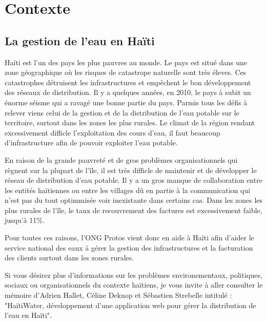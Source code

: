 \documentclass{EPL-master-thesis-covers-FR}
\begin{document}

	\chapter{Contexte}


		\section{La gestion de l'eau en Haïti}
			\label{sec:situation}
			
				Haïti est l'un des pays les plus pauvres au monde. Le pays est situé dans une zone géographique où les risques de catastrope naturelle sont très éleves. Ces catastrophes détruisent les infrastructures et empêchent le bon développement des réseaux de distribution. Il y a quelques années, en 2010, le pays à subit un énorme séisme qui a ravagé une bonne partie du pays. Parmis tous les défis à relever viens celui de la gestion et de la distribution de l'eau potable sur le territoire, surtout dans les zones les plus rurales. Le climat de la région rendant excessivement difficle l'exploitation des cours d'eau, il faut beaucoup d'infrastructure afin de pouvoir exploiter l'eau potable.
				
				En raison de la grande pauvreté et de gros problèmes organisationnels qui règnent sur la plupart de l'île, il est très difficle de maintenir et de développer le réseau de distribution d'eau potable. Il y a un gros manque de collaboration entre les entités haïtiennes ou entre les villages dû en partie à la communication qui n'est pas du tout optimmisée voir inexistante dans certains cas. Dans les zones les plus rurales de l'île, le taux de recouvrement des factures est excessivement faible, jusqu'à 11\%.
				
				Pour toutes ces raisons, l'ONG Protos vient donc en aide à Haïti afin d'aider le service national des eaux à gérer la gestion des infrastructures et la facturation des clients surtout dans les zones rurales.
				
				Si vous désirez plus d'informations sur les problèmes environementaux, politiques, sociaux ou organisationnels du contexte haïtiens, je vous invite à aller consulter le mémoire d'Adrien Hallet, Céline Deknop et Sébastien Strebelle intitulé :
				"HaïtiWater, développement d'une application web pour gérer la distribution de l'eau en Haïti".

\end{document}
